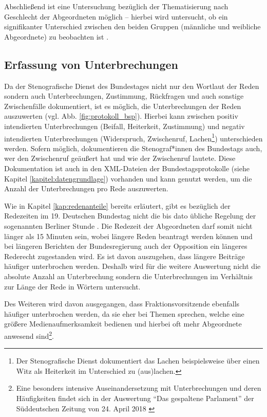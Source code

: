 \documentclass[12pt, 
    twoside=false, 
    bibliography=totoc, 
    numbers=endperiod, 
    headings=normal, 
    toc=chapterentrydotfill
    ]{scrbook}
\begin{document}
Abschließend ist eine Untersuchung bezüglich der Thematisierung nach Geschlecht der Abgeordneten möglich -- hierbei wird untersucht, ob ein signifikanter Unterschied zwischen den beiden Gruppen (männliche und weibliche Abgeordnete) zu beobachten ist \parencite[vgl.][3]{roberts_2013}. 


\subsection{Erfassung von Unterbrechungen}\label{kapitel:erfassung_unterbrechung}

Da der Stenografische Dienst des Bundestages nicht nur den Wortlaut der Reden sondern auch Unterbrechungen, Zustimmung, Rückfragen und auch sonstige Zwischenfälle dokumentiert, ist es möglich, die Unterbrechungen der Reden auszuwerten (vgl. Abb. \ref{fig:protokoll_bsp}). Hierbei kann zwischen positiv intendierten Unterbrechungen (Beifall, Heiterkeit, Zustimmung) und negativ intendierten Unterbrechungen (Widerspruch, Zwischenruf, Lachen\footnote{Der Stenografische Dienst dokumentiert das Lachen beispielsweise über einen Witz als Heiterkeit im Unterschied zu (aus)lachen.}) unterschieden werden.
Sofern möglich, dokumentieren die Stenograf*innen des Bundestags auch, wer den Zwischenruf geäußert hat und wie der Zwischenruf lautete. Diese Dokumentation ist auch in den XML-Dateien der Bundestagsprotokolle (siehe Kapitel \ref{kapitel:datengrundlage}) vorhanden und kann genutzt werden, um die Anzahl der Unterbrechungen pro Rede auszuwerten.

Wie in Kapitel \ref{kap:redenanteile} bereits erläutert, gibt es bezüglich der Redezeiten im 19. Deutschen Bundestag nicht die bis dato übliche Regelung der sogenannten Berliner Stunde \parencite[vgl.][]{schreiner_2005}. Die Redezeit der Abgeordneten darf somit nicht länger als 15 Minuten sein, wobei längere Reden beantragt werden können und bei längeren Berichten der Bundesregierung auch der Opposition ein längeres Rederecht zugestanden wird. Es ist davon auszugehen, dass längere Beiträge häufiger unterbrochen werden. Deshalb wird für die weitere Auswertung nicht die absolute Anzahl an Unterbrechung sondern die Unterbrechungen im Verhältnis zur Länge der Rede in Wörtern untersucht.

Des Weiteren wird davon ausgegangen, dass Fraktionsvorsitzende ebenfalls häufiger unterbrochen werden, da sie eher bei Themen sprechen, welche eine größere Medienaufmerksamkeit bedienen und hierbei oft mehr Abgeordnete anwesend sind\footnote{Eine besonders intensive Auseinandersetzung mit Unterbrechungen und deren Häufigkeiten findet sich in der Auswertung \enquote{Das gespaltene Parlament} der Süddeutschen Zeitung von 24. April 2018 \parencite{sueddeutsche_2018}}.
\end{document}
